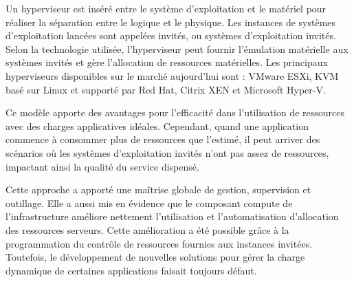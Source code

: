 Un hyperviseur est inséré entre le système d'exploitation et le matériel pour réaliser la séparation entre le logique et le physique. Les instances de systèmes d'exploitation lancées sont appelées invités, ou systèmes d'exploitation invités. Selon la technologie utilisée, l'hyperviseur peut fournir l'émulation matérielle aux systèmes invités et gère l'allocation de ressources matérielles.  Les principaux hyperviseurs disponibles sur le marché aujourd'hui sont : VMware ESXi, KVM basé sur Linux et supporté par Red Hat, Citrix XEN et Microsoft Hyper-V. 

Ce modèle apporte des avantages pour l'efficacité dans l'utilisation de ressources avec des charges applicatives idéales.
 Cependant, quand une application commence à consommer plus de ressources que l'estimé, il peut arriver des scénarios où les systèmes d'exploitation invités n'ont pas assez de ressources, impactant ainsi la qualité du service dispensé. 

Cette approche a apporté une maîtrise globale de gestion, supervision et outillage. Elle a aussi mis en évidence que le composant \og \gls{compute} \fg{} de l'infrastructure améliore nettement l'utilisation et l'automatisation d'allocation des ressources serveurs. Cette amélioration a été possible grâce à la programmation du contrôle de ressources fournies aux instances invitées. Toutefois, le développement de nouvelles solutions pour gérer la charge dynamique de certaines applications faisait toujours défaut. \cite{journeySDDC} \cite{ibmPlanningVirtCCchap2}




